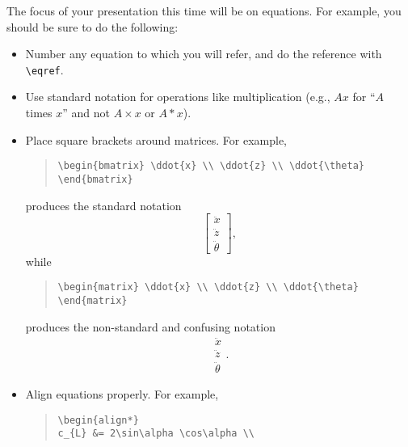 \documentclass[12pt]{article}
\begin{document}
The focus of your presentation this time will be on equations. For example, you should be sure to do the following:
\begin{itemize}
\item Number any equation to which you will refer, and do the reference with \lstinline|\eqref|.
\item Use standard notation for operations like multiplication (e.g., $Ax$ for ``$A$ times $x$'' and not $A\times x$ or $A*x$).
\item Place square brackets around matrices. For example,
\begin{quote}
\begin{lstlisting}[language={[LaTeX]TeX}]
\begin{bmatrix} \ddot{x} \\ \ddot{z} \\ \ddot{\theta} \end{bmatrix}
\end{lstlisting}
\end{quote}
produces the standard notation
\begin{equation*}
\begin{bmatrix} \ddot{x} \\ \ddot{z} \\ \ddot{\theta} \end{bmatrix},
\end{equation*}
while
\begin{quote}
\begin{lstlisting}[language={[LaTeX]TeX}]
\begin{matrix} \ddot{x} \\ \ddot{z} \\ \ddot{\theta} \end{matrix}
\end{lstlisting}
\end{quote}
produces the non-standard and confusing notation
\begin{equation*}
\begin{matrix} \ddot{x} \\ \ddot{z} \\ \ddot{\theta} \end{matrix}.
\end{equation*}
\item Align equations properly. For example,
\begin{quote}
\begin{lstlisting}[language={[LaTeX]TeX}]
\begin{align*}
c_{L} &= 2\sin\alpha \cos\alpha \\ 

\end{lstlisting}
\end{quote}
\end{itemize}
\end{document}
